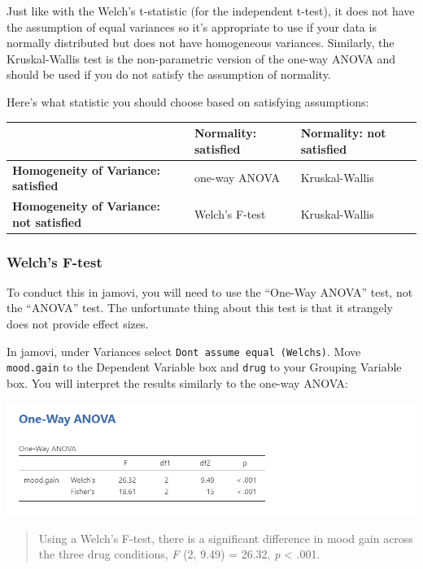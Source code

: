\documentclass[
]{book}
\begin{document}
Just like with the Welch's t-statistic (for the independent t-test), it does not have the assumption of equal variances so it's appropriate to use if your data is normally distributed but does not have homogeneous variances. Similarly, the Kruskal-Wallis test is the non-parametric version of the one-way ANOVA and should be used if you do not satisfy the assumption of normality.

Here's what statistic you should choose based on satisfying assumptions:

\begin{longtable}[]{@{}lll@{}}
\toprule
& \textbf{Normality: satisfied} & \textbf{Normality: not satisfied} \\
\midrule
\endhead
\textbf{Homogeneity of Variance: satisfied} & one-way ANOVA & Kruskal-Wallis \\
\textbf{Homogeneity of Variance: not satisfied} & Welch's F-test & Kruskal-Wallis \\
\bottomrule
\end{longtable}

\hypertarget{welchs-f-test}{%
\subsubsection{Welch's F-test}\label{welchs-f-test}}

To conduct this in jamovi, you will need to use the ``One-Way ANOVA'' test, not the ``ANOVA'' test. The unfortunate thing about this test is that it strangely does not provide effect sizes.

In jamovi, under Variances select \texttt{Don\textquotesingle{}t\ assume\ equal\ (Welch\textquotesingle{}s)}. Move \texttt{mood.gain} to the Dependent Variable box and \texttt{drug} to your Grouping Variable box. You will interpret the results similarly to the one-way ANOVA:

\includegraphics{images/04_one-way-anova/one-way_results_Welch.png}

\begin{quote}
Using a Welch's F-test, there is a significant difference in mood gain across the three drug conditions, \emph{F} (2, 9.49) = 26.32, \emph{p} \textless{} .001.
\end{quote}
\end{document}
